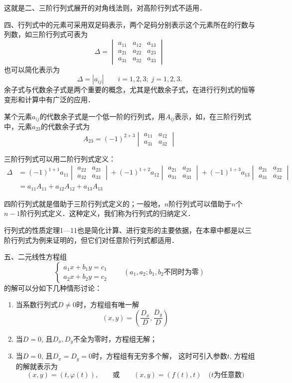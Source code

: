 这就是二、三阶行列式展开的对角线法则，对高阶行列式不适用．

四、行列式中的元素可采用双足码表示，两个足码分别表示这个元素所在的行数与列数，如三阶行列式可表为
\[\Delta =\begin{vmatrix}
    a_{11}&a_{12}&a_{13}\\a_{21}&a_{22}&a_{23}\\a_{31}&a_{32}&a_{33}
\end{vmatrix}\]
也可以简化表示为
\[\Delta =|a_{ij}|\qquad i=1,2,3;\; j=1,2,3.\]
余子式与代数余子式是两个重要的概念，尤其是代数余子式，在进行行列式的恒等变形和计算中有广泛的应用．

某个元素$a_{ij}$的代数余子式是一个低一阶的行列式，用$A_{ij}$表示，如，在三阶行列式中，元素$a_{23}$的代数余子式为
\[A_{23}=(-1)^{2+3}\begin{vmatrix}
    a_{11}&a_{12}\\a_{31}&a_{32}
\end{vmatrix}\]

三阶行列式可以用二阶行列式定义：
\[\begin{split}
\Delta&=(-1)^{1+1}a_{11}\begin{vmatrix}
    a_{22}&a_{23}\\a_{32}&a_{33}
\end{vmatrix}+(-1)^{1+2}a_{12}\begin{vmatrix}
    a_{21}&a_{23}\\a_{31}&a_{33}
\end{vmatrix}+(-1)^{1+3}a_{13}\begin{vmatrix}
    a_{21}&a_{22}\\a_{31}&a_{32}
\end{vmatrix}\\
&=a_{11}A_{11}+a_{12}A_{12}+a_{13}A_{13}
\end{split}\]

四阶行列式就是借助于三阶行列式定义的；一般地，$n$阶行列式可以借助于$n$个$n-1$阶行列式定义．这种定义，我们称为行列式的归纳定义．

行列式的性质定理1—11也是简化计算、进行变形的主要依据，在本章中都是以三阶行列式为例来证明的，但它们对任意阶行列式都适用．

五、二元线性方程组
\[\begin{cases}
    a_1x+b_1y=c_1\\
    a_2x+b_2y=c_2
\end{cases}\qquad (\text{$a_1,a_2; b_1,b_2$不同时为零})\]
的解可以分如下几种情形讨论：
\begin{enumerate}
    \item 当系数行列式$D\ne 0$时，方程组有唯一解
\[(x,y)=\left(\frac{D_x}{D},\frac{D_y}{D}\right)\]
\item 当$D=0$, 且$D_x,D_y$不全为零时，方程组无解；
\item 当$D=0$, 且$D_x=D_y=0$时，方程组有无穷多个解，
这时可引入参数$t$, 方程组的解就表示为
\[(x,y)=(t,\varphi(t)),\qquad \text{或}\qquad (x,y)=(f(t),t)\quad \text{($t$为任意数)}\]
\end{enumerate}



